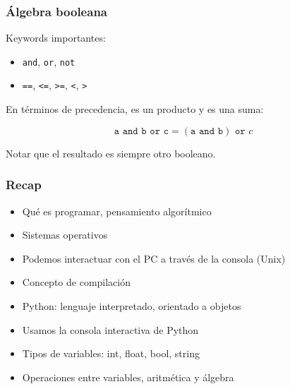 \documentclass[14pt,aspectratio=169,xcolor=dvipsnames]{beamer}
\begin{document}
\begin{frame}\frametitle{Álgebra booleana}
    Keywords importantes: 
    \begin{itemize}
        \item \texttt{and}, \texttt{or}, \texttt{not}
        \item \texttt{==}, \texttt{<=}, \texttt{>=}, \texttt{<}, \texttt{>}
    \end{itemize}

En términos de precedencia,  es un producto y  es una suma: 

$$ \texttt{a and b or c} = (\texttt{a and b}) \texttt{ or } c $$

Notar que el resultado es siempre otro booleano.
\end{frame}
\begin{frame}\frametitle{Recap}
    \begin{itemize}
        \item Qué es programar, pensamiento algorítmico
        \item Sistemas operativos
        \item Podemos interactuar con el PC a través de la consola (Unix)
        \item Concepto de compilación
        \item Python: lenguaje interpretado, orientado a objetos
        \item Usamos la consola interactiva de Python
        \item Tipos de variables: int, float, bool, string
        \item Operaciones entre variables, aritmética y álgebra

    \end{itemize}
\end{frame}

\begin{frame}
    \maketitle
\end{frame}
\end{document}
